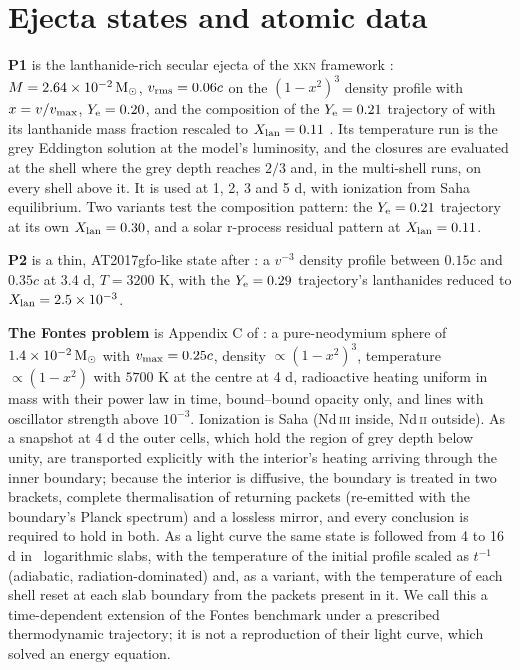 \documentclass[fleqn,usenatbib]{mnras}
\newcommand{\Xlan}{X_{\rm lan}}
\newcommand{\Msun}{{\rm M}_\odot}
\newcommand{\NdII}{Nd\,\textsc{ii}\xspace}
\newcommand{\NdIII}{Nd\,\textsc{iii}\xspace}
\newcommand{\Pone}{P1\xspace}
\newcommand{\Ptwo}{P2\xspace}
\begin{document}
\section{Ejecta states and atomic data}\label{sec:states}

\textbf{\Pone} is the lanthanide-rich secular ejecta of the \textsc{xkn} framework \citep{ricigliano2024}: $M=2.64\times10^{-2}\,\Msun$, $v_{\rm rms}=0.06c$ on the $(1-x^2)^3$ density profile with $x=v/v_{\rm max}$, $Y_{\rm e}=0.20$, and the composition of the $Y_{\rm e}=0.21$ trajectory of \citet{gillanders2022} with its lanthanide mass fraction rescaled to $\Xlan=0.11$ \citep{tanaka2020}. Its temperature run is the grey Eddington solution at the model's luminosity, and the closures are evaluated at the shell where the grey depth reaches $2/3$ and, in the multi-shell runs, on every shell above it. It is used at 1, 2, 3 and 5 d, with ionization from Saha equilibrium. Two variants test the composition pattern: the $Y_{\rm e}=0.21$ trajectory at its own $\Xlan=0.30$, and a solar r-process residual pattern at $\Xlan=0.11$.  %

\textbf{\Ptwo} is a thin, AT2017gfo-like state after \citet{gillanders2022}: a $v^{-3}$ density profile between $0.15c$ and $0.35c$ at 3.4 d, $T=3200$ K, with the $Y_{\rm e}=0.29$ trajectory's lanthanides reduced to $\Xlan=2.5\times10^{-3}$.

\textbf{The Fontes problem} is Appendix C of \citet{fontes2020}: a pure-neodymium sphere of $1.4\times10^{-2}\,\Msun$ with $v_{\rm max}=0.25c$, density $\propto(1-x^2)^3$, temperature $\propto(1-x^2)$ with $5700$ K at the centre at 4 d, radioactive heating uniform in mass with their power law in time, bound--bound opacity only, and lines with oscillator strength above $10^{-3}$. Ionization is Saha (\NdIII inside, \NdII outside). As a snapshot at 4 d the outer cells, which hold the region of grey depth below unity, are transported explicitly with the interior's heating arriving through the inner boundary; because the interior is diffusive, the boundary is treated in two brackets, complete thermalisation of returning packets (re-emitted with the boundary's Planck spectrum) and a lossless mirror, and every conclusion is required to hold in both. As a light curve the same state is followed from 4 to 16 d in \LcSlabs\ logarithmic slabs, with the temperature of the initial profile scaled as $t^{-1}$ (adiabatic, radiation-dominated) and, as a variant, with the temperature of each shell reset at each slab boundary from the packets present in it. We call this a time-dependent extension of the Fontes benchmark under a prescribed thermodynamic trajectory; it is not a reproduction of their light curve, which solved an energy equation.
\end{document}
